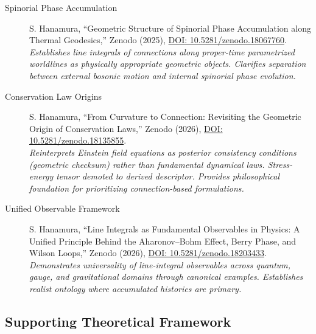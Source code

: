 \documentclass[12pt,letterpaper]{article}
\begin{document}
\begin{description}
\item[Spinorial Phase Accumulation] S. Hanamura, ``Geometric Structure of Spinorial Phase Accumulation along Thermal Geodesics,'' Zenodo (2025), \href{https://doi.org/10.5281/zenodo.18067760}{DOI: 10.5281/zenodo.18067760}. \\
\textit{Establishes line integrals of connections along proper-time parametrized worldlines as physically appropriate geometric objects. Clarifies separation between external bosonic motion and internal spinorial phase evolution.}

\item[Conservation Law Origins] S. Hanamura, ``From Curvature to Connection: Revisiting the Geometric Origin of Conservation Laws,'' Zenodo (2026), \href{https://doi.org/10.5281/zenodo.18135855}{DOI: 10.5281/zenodo.18135855}. \\
\textit{Reinterprets Einstein field equations as posterior consistency conditions (geometric checksum) rather than fundamental dynamical laws. Stress-energy tensor demoted to derived descriptor. Provides philosophical foundation for prioritizing connection-based formulations.}

\item[Unified Observable Framework] S. Hanamura, ``Line Integrals as Fundamental Observables in Physics: A Unified Principle Behind the Aharonov--Bohm Effect, Berry Phase, and Wilson Loops,'' Zenodo (2026), \href{https://doi.org/10.5281/zenodo.18203433}{DOI: 10.5281/zenodo.18203433}. \\
\textit{Demonstrates universality of line-integral observables across quantum, gauge, and gravitational domains through canonical examples. Establishes realist ontology where accumulated histories are primary.}
\end{description}

\subsection*{Supporting Theoretical Framework}
\end{document}
